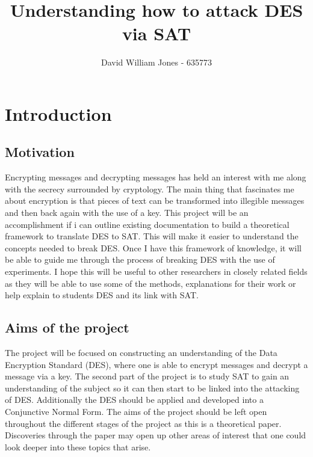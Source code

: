 \documentclass[11pt,a4paper]{report}
\begin{document}
\title{Understanding how to attack DES via SAT}
\author{David William Jones - 635773}

\maketitle
\tableofcontents

\chapter{Introduction}
\label{cha:Introduction}

\section{Motivation}
\label{cha:Motivation}

Encrypting messages and decrypting messages has held an interest with me along with the secrecy surrounded by cryptology. The main thing that fascinates me about encryption is that pieces of text can be transformed into illegible messages and then back again with the use of a key. This project will be an accomplishment if i can outline existing documentation to build a theoretical framework to translate DES to SAT. This will make it easier to understand the concepts needed to break DES. Once I have this framework of knowledge, it will be able to guide me through the process of breaking DES with the use of experiments. I hope this will be useful to other researchers in closely related fields as they will be able to use some of the methods, explanations for their work or help explain to students DES and its link with SAT.



\section{Aims of the project}
\label{cha:Aims}

The project will be focused on constructing an understanding of the Data Encryption Standard (DES), where one is able to encrypt messages and decrypt a message via a key. The second part of the project is to study SAT to gain an understanding of the subject so it can then start to be linked into the attacking of DES. Additionally the DES should be applied and developed into a Conjunctive Normal Form.
The aims of the project should be left open throughout the different stages of the project as this is a theoretical paper. Discoveries through the paper may open up other areas of interest that one could look deeper into these topics that arise.
\end{document}
